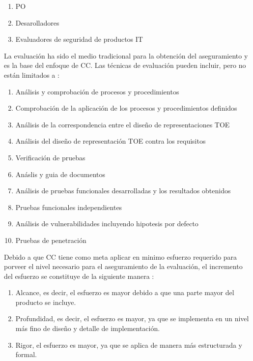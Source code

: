 \documentclass[runningheads,a4paper]{llncs}
\begin{document}
\begin{enumerate}
	\item \gls{PO}
	\item Desarolladores
	\item Evaluadores de seguridad de productos \gls{IT}
\end{enumerate}

La evaluación ha sido el medio tradicional para la obtención del aseguramiento y es la base del enfoque de \gls{CC}. Las técnicas de evaluación pueden incluir, pero no están limitados a \cite{CCIntroduction}:

\begin{enumerate}
	\item Análisis y comprobación de procesos y procedimientos
	\item Comprobación de la aplicación de los procesos y procedimientos definidos
	\item Análisis de la correspondencia entre el diseño de representaciones \gls{TOE}
	\item Análisis del diseño de representación \gls{TOE} contra los requisitos
	\item Verificación de pruebas
	\item Anáslis y guia de documentos
	\item Análisis de pruebas funcionales desarrolladas y los resultados obtenidos
	\item Pruebas funcionales independientes
	\item Análisis de vulnerabilidades incluyendo hipotesis por defecto 
	\item Pruebas de penetración 
\end{enumerate}

Debido a que \gls{CC} tiene como meta aplicar en minimo esfuerzo requerido para porveer el nivel necesario para el aseguramiento de la evaluación, el incremento del esfuerzo se constituye de la siguiente manera \cite{CCIntroduction}:

\begin{enumerate}
	\item Alcance, es decir, el esfuerzo es mayor debido a que una parte mayor del producto se incluye.
	\item Profundidad,  es decir, el esfuerzo es mayor, ya que se implementa en un nivel más fino de diseño y detalle de implementación.
	\item Rigor, el esfuerzo es mayor, ya que se aplica de manera más estructurada y formal.
\end{enumerate}
\end{document}
